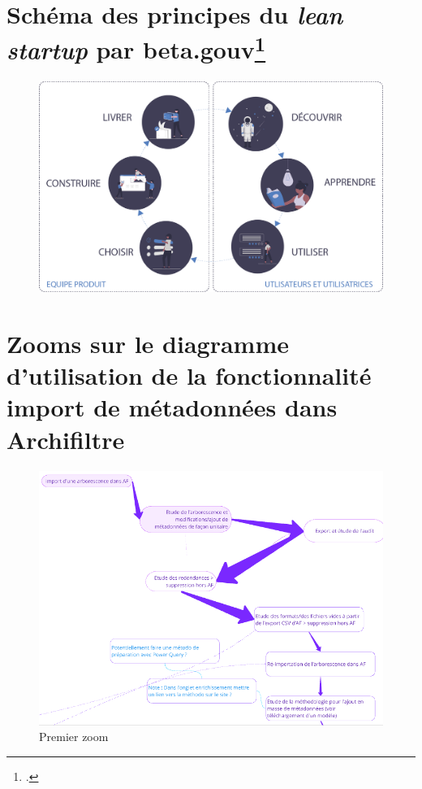 \documentclass[a4paper,12pt,twoside]{book}
\begin{document}
	\chapter[Schéma lean startup]{Schéma des principes du \textit{lean startup} par beta.gouv\footcite[p.18]{betagouv_guide_2024}}
	\begin{figure}[h]
		\centering
		\includegraphics[scale=0.3]{annexes/annexe5.png}
		\label{annexe5}
	\end{figure}

	\chapter[Zooms diagramme d'utilisation]{Zooms sur le diagramme d'utilisation de la fonctionnalité import de métadonnées dans \gls{Archifiltre}
	}

	\begin{figure}[h]
		\centering
		\includegraphics[scale=0.5]{annexes/annexe6.png}
		\caption{Premier zoom}
		\label{annexe6}
	\end{figure}
\end{document}
